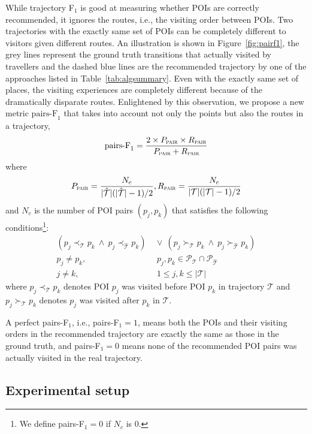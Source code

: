 While trajectory F$_1$ is good at measuring whether POIs are correctly recommended,
it ignores the routes, i.e., the visiting order between POIs.
Two trajectories with the exactly same set of POIs can be completely different to visitors 
given different routes.
An illustration is shown in Figure~\ref{fig:pairf1},
the grey lines represent the ground truth transitions that actually visited by travellers
and the dashed blue lines are the recommended trajectory by one of the approaches listed
in Table~\ref{tab:algsummary}.
Even with the exactly same set of places, the visiting experiences are completely different because 
of the dramatically disparate routes.
Enlightened by this observation, we propose a new metric $\text{pairs-F}_1$ that takes into account 
not only the points but also the routes in a trajectory,
\begin{displaymath}
\text{pairs-F}_1 = \frac{2 \times P_{\textsc{pair}} \times R_{\textsc{pair}}}
                       {P_{\textsc{pair}} + R_{\textsc{pair}}}
\end{displaymath}
where
\begin{displaymath}
P_{\textsc{pair}} = \frac{N_c} {|\hat{\mathcal{T}}|(|\hat{\mathcal{T}}|-1) / 2},
R_{\textsc{pair}} = \frac{N_c} {|\mathcal{T}|(|\mathcal{T}|-1) / 2}
\end{displaymath}
and $N_c$ is the number of POI pairs $(p_j, p_k)$ that satisfies the following
conditions\footnote{We define pairs-F$_1=0$ if $N_c$ is $0$.}:
\begin{align*}
    (p_j \prec_{\mathcal{T}} p_k ~\land~ p_j \prec_{\hat{\mathcal{T}}} p_k) & ~\lor~
    (p_j \succ_{\mathcal{T}} p_k ~\land~ p_j \succ_{\hat{\mathcal{T}}} p_k) \\
    p_j \ne p_k, &~~ p_j, p_k \in \mathcal{P}_{\mathcal{T}} \cap \mathcal{P}_{\hat{\mathcal{T}}} \\
    j \ne k, &~~ 1 \le j, k \le |\mathcal{T}|
\end{align*}
where $p_j \prec_{\mathcal{T}} p_k$ denotes POI $p_j$ was visited before POI $p_k$ in trajectory $\mathcal{T}$
and $p_j \succ_{\mathcal{T}} p_k$ denotes $p_j$ was visited after $p_k$ in $\mathcal{T}$.

A perfect pairs-F$_1$, i.e., pairs-F$_1 = 1$, means both the POIs and their visiting orders in the
recommended trajectory are exactly the same as those in the ground truth,
and pairs-F$_1 = 0$ means none of the recommended POI pairs was actually visited in the real trajectory.


\subsection{Experimental setup}
\label{sec:setup}

